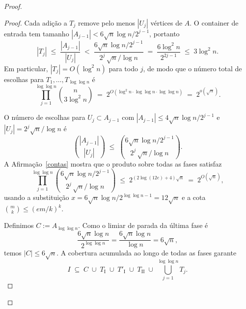 \documentclass[reqno,a4paper,12pt]{amsart}
\begin{document}
\begin{proof}
\begin{proof}
    Cada adição a $T_j$ remove pelo menos $|U_j|$ vértices de $A$. O container de entrada tem
    tamanho $|A_{j-1}| < 6\sqrt{n}\log n / 2^{j-1}$, portanto
    \[
      |T_j| \;\leq\; \frac{|A_{j-1}|}{|U_j|}
      \;<\; \frac{6\sqrt{n}\log n / 2^{j-1}}{2^j\,\sqrt{n}/\log n}
      \;=\; \frac{6\log^2 n}{2^{2j-1}}
      \;\leq\; 3\log^2 n.
    \]
    Em particular, $|T_j| = O(\log^2 n)$ para todo $j$, de modo que o número total de escolhas para
    $T_1, \ldots, T_{\log\log n}$ é
    \[
      \prod_{j=1}^{\log\log n} \binom{n}{3\log^2 n}
      \;=\; 2^{O(\log^2 n \cdot \log\log n \cdot \log\log n)}
      \;=\; 2^{o(\sqrt{n})}.
    \]

    O número de escolhas para $U_j \subset A_{j-1}$ com $|A_{j-1}| \leq 4\sqrt{n}\log n / 2^{j-1}$
    e $|U_j| = 2^j\sqrt{n}/\log n$ é
    \[
      \binom{|A_{j-1}|}{|U_j|}
      \;\leq\; \binom{6\sqrt{n}\log n / 2^{j-1}}{2^j\,\sqrt{n}/\log n}.
    \]
    A Afirmação~\ref{contas} mostra que o produto sobre todas as fases satisfaz
    \[
      \prod_{j=1}^{\log\log n}
      \binom{6\sqrt{n}\log n / 2^{j-1}}{2^j\,\sqrt{n}/\log n}
      \;\leq\; 2^{(2\log(12e)+4)\sqrt{n}}
      \;=\; 2^{O(\sqrt{n})},
    \]
    usando a substituição $x = 6\sqrt{n}\log n / 2^{\log\log n - 1} = 12\sqrt{n}$ e a cota
    $\binom{m}{k} \leq (em/k)^k$.

    \medskip
    Definimos $C := A_{\log\log n}$. Como o limiar de parada da última fase é
    \[
      \frac{6\sqrt{n}\log n}{2^{\log\log n}} = \frac{6\sqrt{n}\log n}{\log n} = 6\sqrt{n},
    \]
    temos $|C| \leq 6\sqrt{n}$. A cobertura acumulada ao longo de todas as fases garante
    \[
      I \;\subseteq\; C \;\cup\; T_{\mathrm{I}} \;\cup\; T'_{\mathrm{I}} \;\cup\; T_{\mathrm{II}}
      \;\cup\; \bigcup_{j=1}^{\log\log n} T_j.
    \]



\end{proof}
\end{proof}
\end{document}
